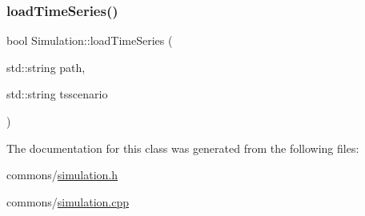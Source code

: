 \subsubsection{\texorpdfstring{loadTimeSeries()}{loadTimeSeries()}}
{\footnotesize\ttfamily bool Simulation\+::load\+Time\+Series (\begin{DoxyParamCaption}\item[{std\+::string}]{path,  }\item[{std\+::string}]{tsscenario }\end{DoxyParamCaption})}



The documentation for this class was generated from the following files\+:\begin{DoxyCompactItemize}
\item 
commons/\mbox{\hyperlink{simulation_8h}{simulation.\+h}}\item 
commons/\mbox{\hyperlink{simulation_8cpp}{simulation.\+cpp}}\end{DoxyCompactItemize}
